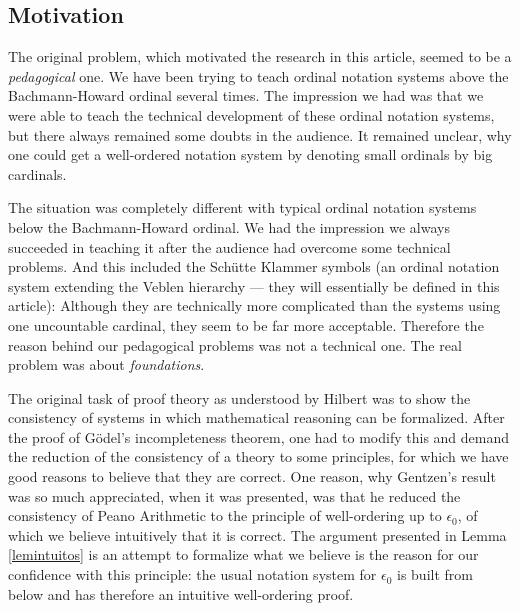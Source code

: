 \documentclass[10pt]{article}
\begin{document}
\subsection{Motivation}
The original problem, which motivated the research in this article,
seemed to be a {\em pedagogical} one. We have been trying to teach ordinal 
notation systems above the Bachmann-Howard ordinal several times. 
The impression we had was that we were
able to teach the technical development of these ordinal notation systems,
but there always remained some doubts in the audience. It remained 
unclear, why one could get a well-ordered
notation system by denoting small ordinals by big cardinals.\par  
The situation was completely different with typical ordinal
notation systems below the Bachmann-Howard ordinal. We had the impression
we always succeeded in teaching it after the audience had overcome
some technical problems.  And this included the Sch{\"u}tte Klammer symbols
(an ordinal notation system extending the Veblen hierarchy ---
they will essentially be defined in this article):
Although they are technically more complicated
than the systems using one uncountable cardinal, they seem to be 
far more acceptable. Therefore the reason behind our
pedagogical problems was not a technical one. 
The real problem was about {\em foundations}.\par 
The original task of proof theory as understood by
Hilbert was to show the consistency of systems in which
mathematical reasoning can be formalized. 
After the proof of G{\"o}del's 
incompleteness theorem, one had to modify this and demand the 
reduction of the consistency of a theory to some principles, for which
we have good reasons to believe that  they are  correct. 
One reason, why Gentzen's result was so much appreciated, when it was
presented, was 
that he reduced the consistency of Peano Arithmetic to the principle
of well-ordering
up to $\epsilon_0$, of which we believe intuitively that it is  correct.
The argument presented in Lemma \ref{lemintuitos} is an attempt to 
formalize what we believe is the reason for our confidence with
this principle: the usual notation system for $\epsilon_0$ 
is built from below and has therefore 
an intuitive well-ordering proof.\par 
\end{document}
